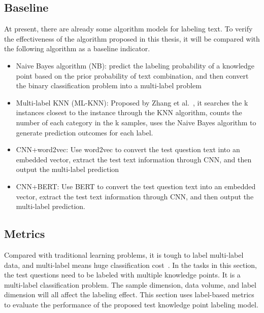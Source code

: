 
\subsection{Baseline}
At present, there are already some algorithm models for labeling text. To verify the effectiveness of the algorithm proposed in this thesis, it will be compared with the following algorithm as a baseline indicator.
\begin{itemize}
	\item Naive Bayes algorithm (NB): predict the labeling probability of a knowledge point based on the prior probability of text combination, and then convert the binary classification problem into a multi-label problem
	\item Multi-label KNN (ML-KNN): Proposed by Zhang et al.~\cite{zhang2007ml}, it searches the k instances closest to the instance through the KNN algorithm, counts the number of each category in the k samples, uses the Naive Bayes algorithm to generate prediction outcomes for each label.
	\item CNN+word2vec: Use word2vec to convert the test question text into an embedded vector, extract the test text information through CNN, and then output the multi-label prediction
	\item CNN+BERT\@: Use BERT to convert the test question text into an embedded vector, extract the test text information through CNN, and then output the multi-label prediction.
\end{itemize}

\subsection{Metrics}
Compared with traditional learning problems, it is tough to label multi-label data, and multi-label means huge classification cost~\cite{zhang2013review}. In the tasks in this section, the test questions need to be labeled with multiple knowledge points. It is a multi-label classification problem. The sample dimension, data volume, and label dimension will all affect the labeling effect. This section uses label-based metrics to evaluate the performance of the proposed test knowledge point labeling model.

